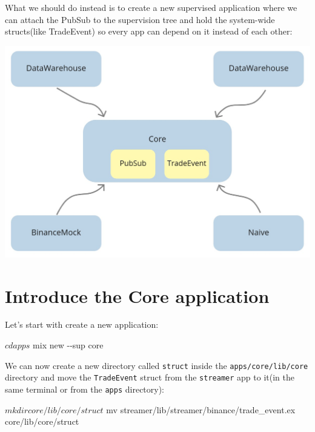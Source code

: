 \documentclass[
  oneside]{book}
\newenvironment{Shaded}{\begin{snugshade}}{\end{snugshade}}
\newcommand{\AttributeTok}[1]{\textcolor[rgb]{0.13,0.29,0.53}{#1}}
\newcommand{\ExtensionTok}[1]{#1}
\newcommand{\NormalTok}[1]{#1}
\begin{document}
What we should do instead is to create a new supervised application where we can attach the PubSub to the supervision tree and hold the system-wide structs(like TradeEvent) so every app can depend on it instead of each other:

\begin{center}\includegraphics[width=1\linewidth]{images/chapter_16_04_core} \end{center}

\newpage

\section{Introduce the Core application}\label{introduce-the-core-application}

Let's start with create a new application:

\begin{Shaded}
\begin{Highlighting}[]
\ExtensionTok{$}\NormalTok{ cd apps}
\ExtensionTok{$}\NormalTok{ mix new }\AttributeTok{{-}{-}sup}\NormalTok{ core}
\end{Highlighting}
\end{Shaded}

We can now create a new directory called \texttt{struct} inside the \texttt{apps/core/lib/core} directory and move the \texttt{TradeEvent} struct from the \texttt{streamer} app to it(in the same terminal or from the \texttt{apps} directory):

\begin{Shaded}
\begin{Highlighting}[]
\ExtensionTok{$}\NormalTok{ mkdir core/lib/core/struct}
\ExtensionTok{$}\NormalTok{ mv streamer/lib/streamer/binance/trade\_event.ex core/lib/core/struct}
\end{Highlighting}
\end{Shaded}
\end{document}
